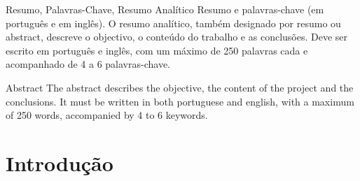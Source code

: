 \documentclass[portuguese]{ist-thesis}
\begin{document}
\makecover

\begin{dedication}
	\lipsum[1] %
\end{dedication}

\begin{acknowledgements}
	\lipsum[2] %
\end{acknowledgements}

\begin{tabstract}{Resumo, Palavras-Chave, Resumo Analítico}
	Resumo e palavras-chave (em português e em inglês). O resumo analítico, também designado por resumo ou abstract, descreve o objectivo, o conteúdo do trabalho e as conclusões. Deve ser escrito em português e inglês, com um máximo de 250 palavras cada e acompanhado de 4 a 6 palavras-chave.
\end{tabstract}

\begin{fabstract}{Abstract}
	The abstract describes the objective, the content of the project and the conclusions. It must be written in both portuguese and english, with a maximum of 250 words, accompanied by 4 to 6 keywords.
\end{fabstract}

\tableofcontents

\listoffigures

\listoftables

\printunsrtglossary[style = long, nogroupskip]
\printunsrtglossary[type = abbreviations, style = long, nogroupskip, title = {Lista de Acrónimos}]
\printunsrtglossary[type = symbols, nogroupskip, title = {Lista de Símbolos}]

\mainstart

\chapter{Introdução}
\end{document}
